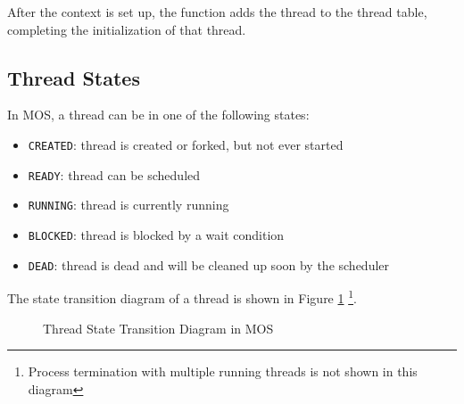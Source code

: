 After the context is set up, the function adds the thread to the thread table, completing
the initialization of that thread.

\subsection{Thread States}

In MOS, a thread can be in one of the following states:

\begin{itemize}
    \item \texttt{CREATED}: thread is created or forked, but not ever started
    \item \texttt{READY}: thread can be scheduled
    \item \texttt{RUNNING}: thread is currently running
    \item \texttt{BLOCKED}: thread is blocked by a wait condition
    \item \texttt{DEAD}: thread is dead and will be cleaned up soon by the scheduler
\end{itemize}

The state transition diagram of a thread is shown in Figure \ref{fig:thread-state-transition}
\footnote{Process termination with multiple running threads is not shown in this diagram}.

\begin{figure}
    \centering
    \caption{Thread State Transition Diagram in MOS}
    \label{fig:thread-state-transition}
\end{figure}

